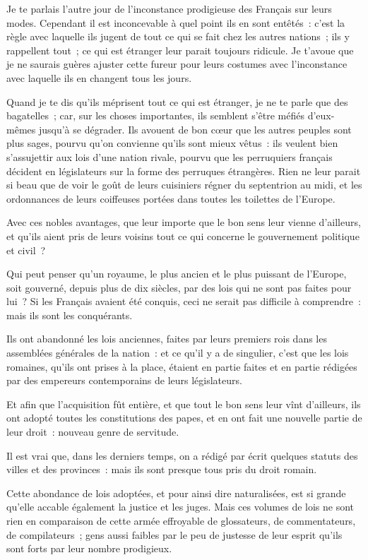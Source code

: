 \documentclass[french,twoside]{book} %
\begin{document}
\noindent Je te parlais l’autre jour de l’inconstance prodigieuse des Français sur leurs modes. Cependant il est inconcevable à quel point ils en sont entêtés : c’est la règle avec laquelle ils jugent de tout ce qui se fait chez les autres nations ; ils y rappellent tout ; ce qui est étranger leur parait toujours ridicule. Je t’avoue que je ne saurais guères ajuster cette fureur pour leurs costumes avec l’inconstance avec laquelle ils en changent tous les jours.\par
Quand je te dis qu’ils méprisent tout ce qui est étranger, je ne te parle que des bagatelles ; car, sur les choses importantes, ils semblent s’être méfiés d’eux-mêmes jusqu’à se dégrader. Ils avouent de bon cœur que les autres peuples sont plus sages, pourvu qu’on convienne qu’ils sont mieux vêtus : ils veulent bien s’assujettir aux lois d’une nation rivale, pourvu que les perruquiers français décident en législateurs sur la forme des perruques étrangères. Rien ne leur parait si beau que de voir le goût de leurs cuisiniers régner du septentrion au midi, et les ordonnances de leurs coiffeuses portées dans toutes les toilettes de l’Europe.\par
Avec ces nobles avantages, que leur importe que le bon sens leur vienne d’ailleurs, et qu’ils aient pris de leurs voisins tout ce qui concerne le gouvernement politique et civil ?\par
Qui peut penser qu’un royaume, le plus ancien et le plus puissant de l’Europe, soit gouverné, depuis plus de dix siècles, par des lois qui ne sont pas faites pour lui ? Si les Français avaient été conquis, ceci ne serait pas difficile à comprendre : mais ils sont les conquérants.\par
Ils ont abandonné les lois anciennes, faites par leurs premiers rois dans les assemblées générales de la nation : et ce qu’il y a de singulier, c’est que les lois romaines, qu’ils ont prises à la place, étaient en partie faites et en partie rédigées par des empereurs contemporains de leurs législateurs.\par
Et afin que l’acquisition fût entière, et que tout le bon sens leur vînt d’ailleurs, ils ont adopté toutes les constitutions des papes, et en ont fait une nouvelle partie de leur droit : nouveau genre de servitude.\par
Il est vrai que, dans les derniers temps, on a rédigé par écrit quelques statuts des villes et des provinces : mais ils sont presque tous pris du droit romain.\par
Cette abondance de lois adoptées, et pour ainsi dire naturalisées, est si grande qu’elle accable également la justice et les juges. Mais ces volumes de lois ne sont rien en comparaison de cette armée effroyable de glossateurs, de commentateurs, de compilateurs ; gens aussi faibles par le peu de justesse de leur esprit qu’ils sont forts par leur nombre prodigieux.\par
\end{document}
